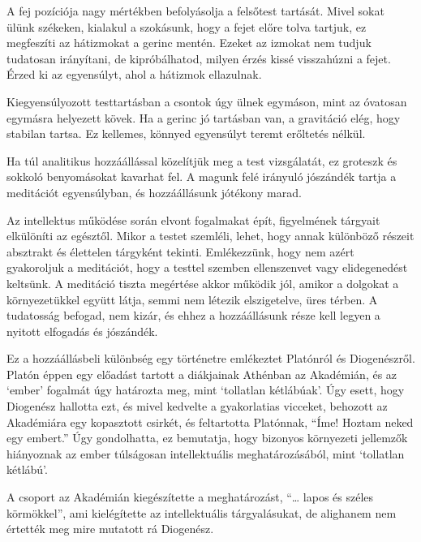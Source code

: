 A fej pozíciója nagy mértékben befolyásolja a felsőtest tartását. Mivel
sokat ülünk székeken, kialakul a szokásunk, hogy a fejet előre tolva
tartjuk, ez megfeszíti az hátizmokat a gerinc mentén. Ezeket az izmokat
nem tudjuk tudatosan irányítani, de kipróbálhatod, milyen érzés kissé
visszahúzni a fejet. Érzed ki az egyensúlyt, ahol a hátizmok ellazulnak.

Kiegyensúlyozott testtartásban a csontok úgy ülnek egymáson, mint az
óvatosan egymásra helyezett kövek. Ha a gerinc jó tartásban van, a
gravitáció elég, hogy stabilan tartsa. Ez kellemes, könnyed egyensúlyt
teremt erőltetés nélkül.

\enlargethispage*{\baselineskip}


Ha túl analitikus hozzáállással közelítjük meg a test vizsgálatát, ez
groteszk és sokkoló benyomásokat kavarhat fel. A magunk felé irányuló
jószándék tartja a meditációt egyensúlyban, és hozzáállásunk jótékony
marad.

Az intellektus működése során elvont fogalmakat épít, figyelmének
tárgyait elkülöníti az egésztől. Mikor a testet szemléli, lehet, hogy
annak különböző részeit absztrakt és élettelen tárgyként tekinti.
Emlékezzünk, hogy nem azért gyakoroljuk a meditációt, hogy a testtel
szemben ellenszenvet vagy elidegenedést keltsünk. A meditáció tiszta
megértése akkor működik jól, amikor a dolgokat a környezetükkel együtt
látja, semmi nem létezik elszigetelve, üres térben. A tudatosság
befogad, nem kizár, és ehhez a hozzáállásunk része kell legyen a nyitott
elfogadás és jószándék.

Ez a hozzáállásbeli különbség egy történetre emlékeztet Platónról és
Diogenészről. Platón éppen egy előadást tartott a diákjainak Athénban az
Akadémián, és az `ember' fogalmát úgy határozta meg, mint `tollatlan
kétlábúak'. Úgy esett, hogy Diogenész hallotta ezt, és mivel kedvelte a
gyakorlatias vicceket, behozott az Akadémiára egy kopasztott csirkét, és
feltartotta Platónnak, ``Íme! Hoztam neked egy embert.'' Úgy
gondolhatta, ez bemutatja, hogy bizonyos környezeti jellemzők hiányoznak
az ember túlságosan intellektuális meghatározásából, mint `tollatlan
kétlábú'.

A csoport az Akadémián kiegészítette a meghatározást, ``\ldots{} lapos
és széles körmökkel'', ami kielégítette az intellektuális tárgyalásukat,
de alighanem nem értették meg mire mutatott rá Diogenész.


